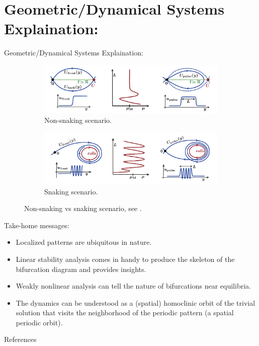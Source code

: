 \documentclass{beamer}
\begin{document}
\section{Geometric/Dynamical Systems Explaination:}
\begin{frame}{Geometric/Dynamical Systems Explaination:}

\begin{figure}[ht]
\begin{subfigure}{\textwidth}
  \centering
  \includegraphics[scale=0.4]
  {Figs/nonsnaking_scenario.png}  
  \caption{Non-snaking scenario.}
  \label{fig:nonsnaking_scenario}
\end{subfigure}
\begin{subfigure}{\textwidth}
  \centering
  \includegraphics[scale = 0.4]
  {Figs/snaking_scenario.png}  
  \caption{Snaking scenario.}
  \label{fig:snaking_scenario}
\end{subfigure}
\caption{Non-snaking vs snaking scenario, see \cite{lloyd2008localized}.}
\label{fig:snaking_vs_nonsnaking}
\end{figure}
\end{frame}

\begin{frame}{Take-home messages:}
\begin{itemize}
 \item Localized patterns are ubiquitous in nature.
 \item Linear stability analysis comes in handy to produce the skeleton of the bifurcation diagram and provides insights.
 \item Weakly nonlinear analysis can tell the nature of bifurcations near equilibria.
 \item The dynamics can be understood as a (spatial) homoclinic orbit of the trivial solution that visits the neighborhood of the periodic pattern (a spatial periodic orbit).
\end{itemize}
\end{frame}

\begin{frame}{References}


\end{frame}
\end{document}
